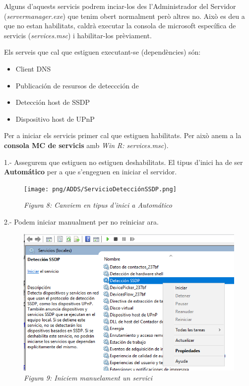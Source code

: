 \documentclass[
  a4paper,
]{article}
\providecommand{\tightlist}{%
  \setlength{\itemsep}{0pt}\setlength{\parskip}{0pt}}
\begin{document}
Alguns d'aquests servicis podrem inciar-los des l'Administrador del
Servidor (\emph{servermanager.exe}) que tenim obert normalment però
altres no. Això es deu a que no estan habilitats, caldrà executar la
consola de microsoft específica de servicis (\emph{services.msc}) i
habilitar-los prèviament.

Els serveis que cal que estiguen executant-se (dependències) són:

\begin{itemize}
\tightlist
\item
  Client DNS
\item
  Publicación de resursos de deteccción de
\item
  Detección host de SSDP
\item
  Dispositivo host de UPnP
\end{itemize}

Per a iniciar els servicis primer cal que estiguen habilitats. Per això
anem a la \textbf{consola MC de servicis} amb \emph{Win R:
services.msc}).

1.- Assegurem que estiguen no estiguen deshabilitats. El tipus d'inici
ha de ser \textbf{Automático} per a que s'engeguen en iniciar el
servidor.

\begin{figure}
\centering
\texttt{[image: png/ADDS/ServicioDetecciónSSDP.png]}
\caption{\emph{Figura 8: Canviem en tipus d'inici a Automático}}
\end{figure}

2.- Podem iniciar manualment per no reiniciar ara.

\begin{figure}
\centering
\includegraphics{png/ADDS/ServiciInici.png}
\caption{\emph{Figura 9: Iniciem manuelament un servici}}
\end{figure}
\end{document}
